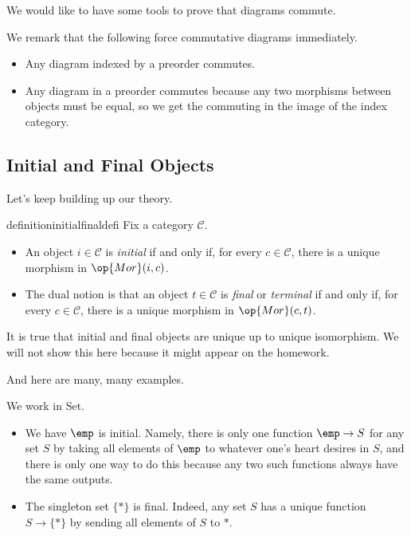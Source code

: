 We would like to have some tools to prove that diagrams commute.
\begin{remark}
	We remark that the following force commutative diagrams immediately.
	\begin{itemize}
		\item Any diagram indexed by a preorder commutes.
		\item Any diagram in a preorder commutes because any two morphisms between objects must be equal, so we get the commuting in the image of the index category.
	\end{itemize}
\end{remark}

\subsection{Initial and Final Objects}
Let's keep building up our theory.
\begin{restatable}{definition}{initialfinaldefi}
	Fix a category $\mathcal C$.
	\begin{itemize}
		\item An object $i\in\mathcal C$ is \textit{initial} if and only if, for every $c\in\mathcal C$, there is a unique morphism in $\op{Mor}(i,c)$.
		\item The dual notion is that an object $t\in\mathcal C$ is \textit{final} or \textit{terminal} if and only if, for every $c\in\mathcal C$, there is a unique morphism in $\op{Mor}(c,t)$.
	\end{itemize}
\end{restatable}
\begin{remark}
	It is true that initial and final objects are unique up to unique isomorphism. We will not show this here because it might appear on the homework.
\end{remark}
And here are many, many examples.
\begin{example}
	We work in $\mathrm{Set}$.
	\begin{itemize}
		\item We have $\emp$ is initial. Namely, there is only one function $\emp\to S$ for any set $S$ by taking all elements of $\emp$ to whatever one's heart desires in $S$, and there is only one way to do this because any two such functions always have the same outputs.
		\item The singleton set $\{*\}$ is final. Indeed, any set $S$ has a unique function $S\to\{*\}$ by sending all elements of $S$ to $*$.
	\end{itemize}
\end{example}
